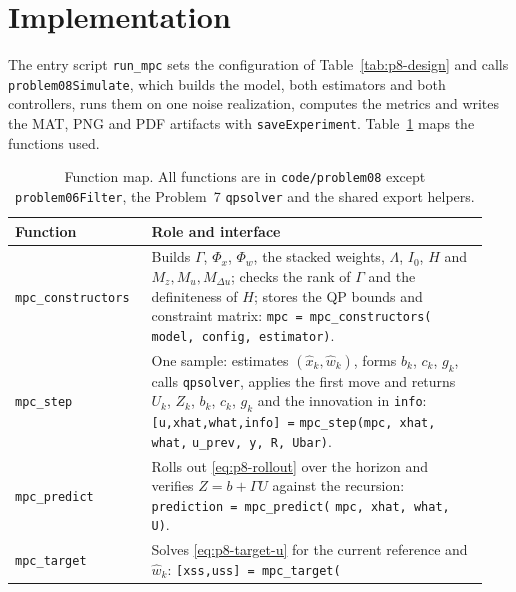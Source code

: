 \section{Implementation}
\label{sec:p8-implementation}

The entry script \texttt{run\_mpc} sets the configuration of
Table~\ref{tab:p8-design} and calls \texttt{problem08Simulate}, which builds the
model, both estimators and both controllers, runs them on one noise realization,
computes the metrics and writes the MAT, PNG and PDF artifacts with
\texttt{saveExperiment}. Table~\ref{tab:p8-functions} maps the functions used.

\begin{table}[htbp]
 \centering
 \caption{Function map. All functions are in \texttt{code/problem08} except
 \texttt{problem06Filter}, the Problem~7 \texttt{qpsolver} and the shared
 export helpers.}
 \label{tab:p8-functions}
 \small
 \begin{tabular}{@{}p{0.27\linewidth}p{0.67\linewidth}@{}}
 \hline
 Function & Role and interface\\
 \hline
 \texttt{mpc\_constructors}
 & Builds $\Gamma$, $\Phi_x$, $\Phi_w$, the stacked weights, $\Lambda$,
   $I_0$, $H$ and $M_z,M_u,M_{\Delta u}$; checks the rank of $\Gamma$ and the
   definiteness of $H$; stores the QP bounds and constraint matrix:\newline
   \texttt{mpc = mpc\_constructors(}\newline
   \texttt{model, config, estimator)}.\\
 \texttt{mpc\_step}
 & One sample: estimates $(\hat x_k,\hat w_k)$, forms $b_k$, $c_k$, $g_k$,
   calls \texttt{qpsolver}, applies the first move and returns
   $U_k$, $Z_k$, $b_k$, $c_k$, $g_k$ and the innovation in \texttt{info}:\newline
   \texttt{[u,xhat,what,info] =}\newline
   \texttt{mpc\_step(mpc, xhat, what,}\newline
   \texttt{u\_prev, y, R, Ubar)}.\\
 \texttt{mpc\_predict}
 & Rolls out \eqref{eq:p8-rollout} over the horizon and verifies
   $Z=b+\Gamma U$ against the recursion:\newline
   \texttt{prediction = mpc\_predict(}\newline
   \texttt{mpc, xhat, what, U)}.\\
 \texttt{mpc\_target}
 & Solves \eqref{eq:p8-target-u} for the current reference and $\hat w_k$:\newline
   \texttt{[xss,uss] = mpc\_target(}\newline

\end{tabular}
\end{table}
